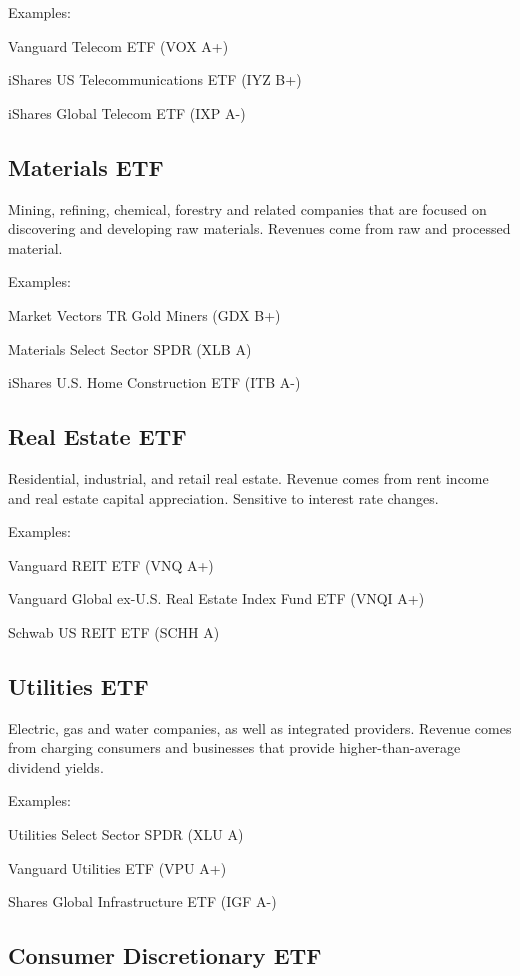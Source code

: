 \documentclass[11pt]{article}
\begin{document}
Examples:


Vanguard Telecom ETF (VOX A+)


iShares US Telecommunications ETF (IYZ B+)


iShares Global Telecom ETF (IXP A-)


\subsection{Materials ETF}

Mining, refining, chemical, forestry and related companies that are focused on discovering and developing raw materials. Revenues come from raw and processed material.


Examples:


Market Vectors TR Gold Miners (GDX B+)


Materials Select Sector SPDR (XLB A)


iShares U.S. Home Construction ETF (ITB A-)


\subsection{Real Estate ETF}

Residential, industrial, and retail real estate. Revenue comes from rent income and real estate capital appreciation. Sensitive to interest rate changes.


Examples:


Vanguard REIT ETF (VNQ A+)


Vanguard Global ex-U.S. Real Estate Index Fund ETF (VNQI A+)


Schwab US REIT ETF (SCHH A)


\subsection{Utilities ETF}

Electric, gas and water companies, as well as integrated providers. Revenue comes from charging consumers and businesses that provide higher-than-average dividend yields.


Examples:


Utilities Select Sector SPDR (XLU A)


Vanguard Utilities ETF (VPU A+)


Shares Global Infrastructure ETF (IGF A-)


\subsection{Consumer Discretionary ETF}
\end{document}
